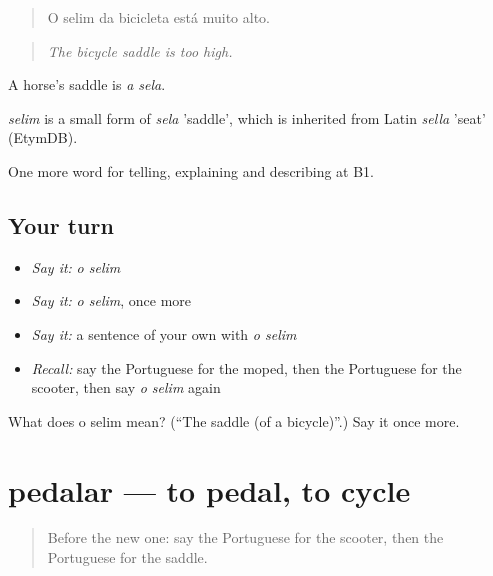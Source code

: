 \begin{quote}
O selim da bicicleta está muito alto.
\end{quote}

\begin{quote}
\emph{The bicycle saddle is too high.}
\end{quote}

A horse's saddle is \emph{a sela}.

\begin{cousinweb}
\emph{selim} is a small form of \emph{sela} 'saddle', which is inherited from Latin \emph{sella} 'seat' (EtymDB).
\end{cousinweb}

\begin{grammarlens}[title={What you've built}]
One more word for telling, explaining and describing at B1.
\end{grammarlens}

\subsection*{Your turn}
\begin{itemize}
\raggedright
  \item \emph{Say it:} \emph{o selim}
  \item \emph{Say it:} \emph{o selim}, once more
  \item \emph{Say it:} a sentence of your own with \emph{o selim}
  \item \emph{Recall:} say the Portuguese for the moped, then the Portuguese for the scooter, then say \emph{o selim} again
\end{itemize}

\begin{tcolorbox}[breakable,colback=teal!4,colframe=teal!35!black,title={Before you move on}]
What does o selim mean? (\textquotedblleft{}The saddle (of a bicycle)\textquotedblright{}.) Say it once more.
\end{tcolorbox}
\section[pedalar]{pedalar — to pedal, to cycle}

\label{lesson:PT-C412-pedalar}



\begin{quote}
Before the new one: say the Portuguese for the scooter, then the Portuguese for the saddle.
\end{quote}

